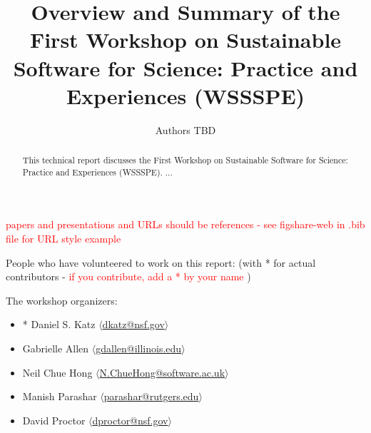 \documentclass[11pt, oneside]{amsart}
\newcommand{\note}[1]{ {\textcolor{red}    { #1 }}}
\begin{document}
\title[]{Overview and Summary of the First Workshop on Sustainable Software for Science: Practice and Experiences (WSSSPE)}

\author{Authors TBD}

%
%
%
%
%


\begin{abstract}
This technical report discusses the First Workshop on Sustainable Software for Science: Practice and Experiences (WSSSPE). ...
\end{abstract}


\maketitle

\note{papers and presentations and URLs should be references - see
  figshare-web in .bib file for URL style example}

People who have volunteered to work on this report: (with * for actual
contributors - \note{if you contribute, add a * by your name})

The workshop organizers:
\begin{itemize}
\item * Daniel S. Katz $\langle$\url{dkatz@nsf.gov}$\rangle$
\item Gabrielle Allen $\langle$\url{gdallen@illinois.edu}$\rangle$
\item Neil Chue Hong $\langle$\url{N.ChueHong@software.ac.uk}$\rangle$
\item Manish Parashar $\langle$\url{parashar@rutgers.edu}$\rangle$
\item David Proctor $\langle$\url{dproctor@nsf.gov}$\rangle$
\end{itemize}
\end{document}
